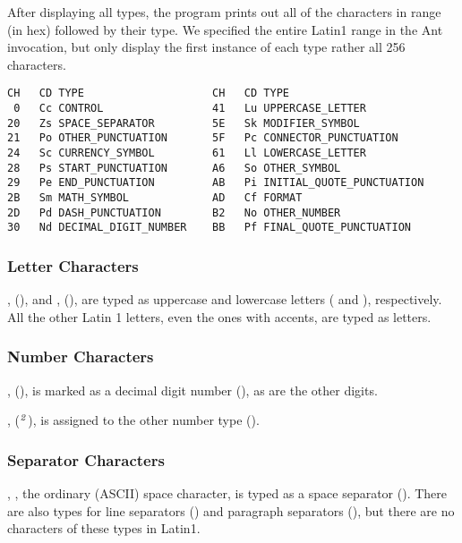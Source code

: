 After displaying all types, the program prints out all of the
characters in range (in hex) followed by their type.  We specified the
entire Latin1 range in the Ant invocation, but only display the first
instance of each type rather all 256 characters.
%
\begin{verbatim}
CH   CD TYPE                    CH   CD TYPE
 0   Cc CONTROL                 41   Lu UPPERCASE_LETTER
20   Zs SPACE_SEPARATOR         5E   Sk MODIFIER_SYMBOL
21   Po OTHER_PUNCTUATION       5F   Pc CONNECTOR_PUNCTUATION
24   Sc CURRENCY_SYMBOL         61   Ll LOWERCASE_LETTER
28   Ps START_PUNCTUATION       A6   So OTHER_SYMBOL
29   Pe END_PUNCTUATION         AB   Pi INITIAL_QUOTE_PUNCTUATION
2B   Sm MATH_SYMBOL             AD   Cf FORMAT
2D   Pd DASH_PUNCTUATION        B2   No OTHER_NUMBER
30   Nd DECIMAL_DIGIT_NUMBER    BB   Pf FINAL_QUOTE_PUNCTUATION
\end{verbatim}
%

\subsubsection{Letter Characters}

, 
(), and ,  (), are typed as uppercase and lowercase letters
( and ), respectively.  All the other Latin 1 letters,
even the ones with accents, are typed as letters.


\subsubsection{Number Characters}

,  (), is marked
as a decimal digit number (), as are the other digits.  

,  (${}^{\rm\small
  {\it 2}}$), is assigned to the other number type
().


\subsubsection{Separator Characters}

, , the ordinary (ASCII) space
character, is typed as a space separator ().  There
are also types for line separators () and paragraph
separators (), but there are no characters of these types
in Latin1.



